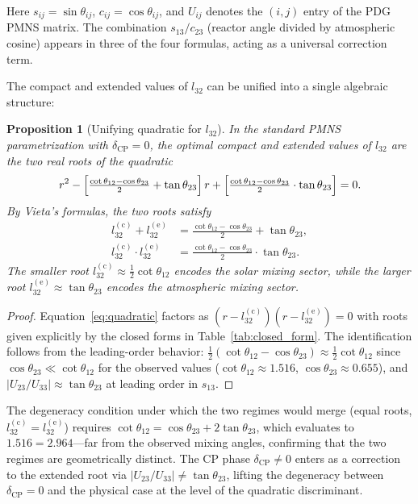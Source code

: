 \documentclass[floatfix,aps,prd,twocolumn,showpacs,superscriptaddress,longbibliography]{revtex4-2}
\newtheorem{proposition}{Proposition}
\begin{document}
\noindent
Here $s_{ij} = \sin\theta_{ij}$, $c_{ij} = \cos\theta_{ij}$,
and $U_{ij}$ denotes the $(i,j)$ entry of the PDG PMNS matrix.
The combination $s_{13}/c_{23}$ (reactor angle divided by
atmospheric cosine) appears in three of the four formulas,
acting as a universal correction term.
 
The compact and extended values of $l_{32}$ can be unified into a
single algebraic structure:
 
\begin{proposition}[Unifying quadratic for $l_{32}$]
\label{prop:quadratic}
In the standard PMNS parametrization with $\delta_{\mathrm{CP}} = 0$,
the optimal compact and extended values of $l_{32}$ are the two
real roots of the quadratic
\begin{equation}
\label{eq:quadratic}
r^2 - \Bigl[\tfrac{\cot\theta_{12} - \cos\theta_{23}}{2}
            + \tan\theta_{23}\Bigr]\,r
     + \Bigl[\tfrac{\cot\theta_{12} - \cos\theta_{23}}{2}
             \cdot \tan\theta_{23}\Bigr] = 0.
\end{equation}
By Vieta's formulas, the two roots satisfy
\begin{align}
l_{32}^{(\mathrm{c})} + l_{32}^{(\mathrm{e})}
  &= \tfrac{\cot\theta_{12} - \cos\theta_{23}}{2} + \tan\theta_{23},
  \label{eq:vieta_sum}\\
l_{32}^{(\mathrm{c})} \cdot l_{32}^{(\mathrm{e})}
  &= \tfrac{\cot\theta_{12} - \cos\theta_{23}}{2} \cdot \tan\theta_{23}.
  \label{eq:vieta_product}
\end{align}
The smaller root $l_{32}^{(\mathrm{c})} \approx \tfrac{1}{2}\cot\theta_{12}$
encodes the \emph{solar} mixing sector, while the larger root
$l_{32}^{(\mathrm{e})} \approx \tan\theta_{23}$ encodes the
\emph{atmospheric} mixing sector.
\end{proposition}
 
\begin{proof}
Equation~\eqref{eq:quadratic} factors as
$(r - l_{32}^{(\mathrm{c})})(r - l_{32}^{(\mathrm{e})}) = 0$
with roots given explicitly by the closed forms in
Table~\ref{tab:closed_form}.
The identification follows from the leading-order behavior:
$\tfrac{1}{2}(\cot\theta_{12} - \cos\theta_{23})
 \approx \tfrac{1}{2}\cot\theta_{12}$ since $\cos\theta_{23} \ll \cot\theta_{12}$
for the observed values ($\cot\theta_{12} \approx 1.516$,
$\cos\theta_{23} \approx 0.655$), and
$|U_{23}/U_{33}| \approx \tan\theta_{23}$ at leading order in $s_{13}$.
\end{proof}
 
\noindent
The degeneracy condition under which the two regimes would merge
(equal roots, $l_{32}^{(\mathrm{c})} = l_{32}^{(\mathrm{e})}$)
requires $\cot\theta_{12} = \cos\theta_{23} + 2\tan\theta_{23}$,
which evaluates to $1.516 = 2.964$---far from the observed mixing
angles, confirming that the two regimes are geometrically distinct.
The CP phase $\delta_{\mathrm{CP}} \neq 0$ enters as a correction to
the extended root via $|U_{23}/U_{33}| \neq \tan\theta_{23}$, lifting
the degeneracy between $\delta_{\mathrm{CP}} = 0$ and the physical
case at the level of the quadratic discriminant.
\end{document}
